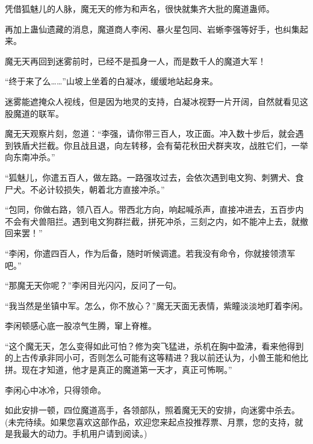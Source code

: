 \begin{this_body}
凭借狐魅儿的人脉，魔无天的修为和声名，很快就集齐大批的魔道蛊师。

再加上蛊仙遗藏的消息，魔道商人李闲、暴火星包同、岩蜥李强等好手，也纠集起来。

魔无天再回到迷雾前时，已经不是孤身一人，而是数千人的魔道大军！

“终于来了么……”山坡上坐着的白凝冰，缓缓地站起身来。

迷雾能遮掩众人视线，但是因为地灵的支持，白凝冰视野一片开阔，自然就看见这股魔道的联军。

魔无天观察片刻，忽道：“李强，请你带三百人，攻正面。冲入数十步后，就会遇到铁盾犬拦截。你且战且退，向左转移，会有菊花秋田犬群夹攻，战胜它们，一举向东南冲杀。”

“狐魅儿，你遣五百人，做左路。一路强攻过去，会依次遇到电文狗、刺猬犬、食尸犬。不必计较损失，朝着北方直接冲杀。”

“包同，你做右路，领八百人。带西北方向，响起喊杀声，直接冲进去，五百步内不会有犬兽阻拦。遇到电文狗群拦截，拼死冲杀，三刻之内，如不能冲上去，就撤回来罢！”

“李闲，你遣四百人，作为后备，随时听候调遣。若我没有命令，你就接领溃军吧。”

“那魔无天你呢？”李闲目光闪闪，反问了一句。

“我当然是坐镇中军。怎么，你不放心？”魔无天面无表情，紫瞳淡淡地盯着李闲。

李闲顿感心底一股凉气生腾，窜上脊椎。

“这个魔无天，怎么变得如此可怕？修为突飞猛进，杀机在胸中盈沸，看来他得到的上古传承非同小可，否则怎么可能有这等精进？我以前还认为，小兽王能和他比拼。现在才知道，他才是真正的魔道第一天才，真正可怖啊。”

李闲心中冰冷，只得领命。

如此安排一顿，四位魔道高手，各领部队，照着魔无天的安排，向迷雾中杀去。(未完待续。如果您喜欢这部作品，欢迎您来起点投推荐票、月票，您的支持，就是我最大的动力。手机用户请到阅读。)

\end{this_body}

